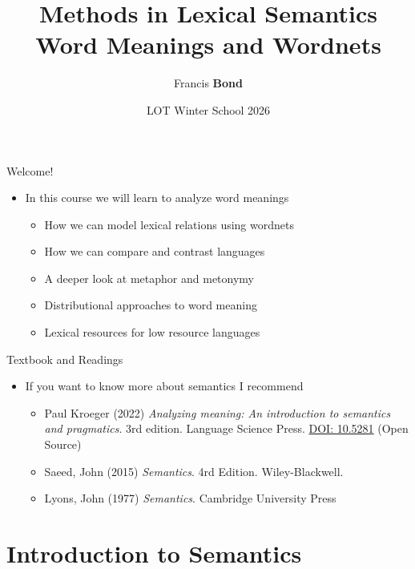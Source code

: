 \documentclass{beamer}
\title[Lexical Relations]{Methods in Lexical Semantics \\
Word Meanings and Wordnets}
\author{Francis \textbf{Bond}}
\institute[Palacký]{Department of Asian Studies,
\\  Palacký University, Olomouc, Czechia
\\[1.5ex] \url{<bond@ieee.org>}}
\date{LOT Winter School 2026}
\begin{document}
\maketitle

%


\begin{frame}{Welcome!}

\begin{itemize}
\item In this course we will learn to analyze word meanings
  \begin{itemize}
  \item How we can model lexical relations using wordnets
  \item How we can compare and contrast languages
  \item A deeper look at metaphor and metonymy
  \item Distributional approaches to word meaning
  \item Lexical resources for low resource languages
  \end{itemize}
\end{itemize}

\end{frame}





\begin{frame}{Textbook and Readings}

\begin{itemize}
\item If you want to know more about semantics I recommend
  \begin{itemize}
  \item Paul Kroeger (2022) \textit{Analyzing meaning: An introduction to semantics and pragmatics}. 3rd edition.  Language Science Press. \href{https://langsci-press.org/catalog/book/359}{DOI: 10.5281}  (Open Source)
  \item Saeed, John (2015) \textit{Semantics}. 4rd Edition. Wiley-Blackwell. 
  \item Lyons, John (1977) \textit{Semantics}.  Cambridge University Press
  \end{itemize}
\end{itemize}
\end{frame}

\section{Introduction to Semantics}
\end{document}
